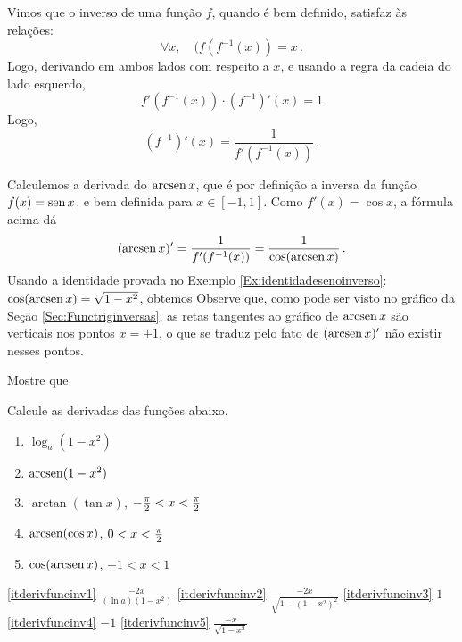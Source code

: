 Vimos que o inverso de uma função $f$, quando é bem definido, satisfaz às
relações:
$$\forall x,\quad (f(f^{-1}(x))=x\,.$$
Logo, derivando em ambos lados com respeito a $x$, e usando a regra da cadeia
do lado esquerdo,
$$
f'(f^{-1}(x))\cdot (f^{-1})'(x)=1
$$
Logo,
$$\boxed{(f^{-1})'(x)=\frac{1}{f'(f^{-1}(x))}\,.}$$

\begin{ex}
Calculemos a derivada do $\operatorname{arcsen} x$, que é por definição a inversa da
função $f(x)=\operatorname{sen} x$, e bem definida para $x\in [-1,1]$. Como $f'(x)=\cos x$, a
fórmula acima dá
$$
(\operatorname{arcsen} x)'=\frac{1}{f'(f^{-1}(x))}=\frac{1}{\cos(\operatorname{arcsen}
x)}\,.$$
Usando a identidade provada no Exemplo
\ref{Ex:identidadesenoinverso}: $\cos(\operatorname{arcsen}
x)=\sqrt{1-x^2}$, obtemos
Observe que, como pode ser visto no gráfico da Seção
\ref{Sec:Functriginversas}, as retas tangentes ao gráfico de $\operatorname{arcsen} x$ são
verticais nos pontos $x=\pm 1$, o que se traduz pelo fato de $(\operatorname{arcsen} x)'$ não
existir nesses pontos.
\end{ex}

\begin{exo}
Mostre que 
\vspace{0.01cm}
\end{exo}

\begin{exo}
 Calcule as derivadas das funções abaixo.
\begin{multicols}{2}
\begin{enumerate}
\item\label{itderivfuncinv1} $\log_a(1-x^2)$
\item\label{itderivfuncinv2} $\operatorname{arcsen}(1-x^2)$
\item\label{itderivfuncinv3} $\arctan (\tan x)$, $-\tfrac{\pi}{2}<x<\tfrac{\pi}{2}$
\item\label{itderivfuncinv4} $\operatorname{arcsen}(\cos x)$, $0<x<\tfrac{\pi}{2}$
\item\label{itderivfuncinv5} $\cos(\operatorname{arcsen} x)$, $-1<x<1$
\end{enumerate}
\end{multicols}
\vspace{0.01cm}
\begin{sol}
\eqref{itderivfuncinv1} $\frac{-2x}{(\ln a)(1-x^2)}$
\eqref{itderivfuncinv2} $\frac{-2x}{\sqrt{1-(1-x^2)^2}}$
\eqref{itderivfuncinv3} $1$
\eqref{itderivfuncinv4} $-1$
\eqref{itderivfuncinv5} $\frac{-x}{\sqrt{1-x^2}}$
\end{sol}
\end{exo}

